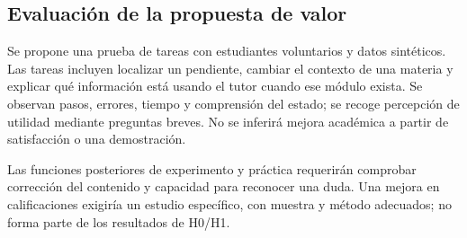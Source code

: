 \subsection{Evaluación de la propuesta de valor}
Se propone una prueba de tareas con estudiantes voluntarios y datos sintéticos. Las tareas incluyen localizar un pendiente, cambiar el contexto de una materia y explicar qué información está usando el tutor cuando ese módulo exista. Se observan pasos, errores, tiempo y comprensión del estado; se recoge percepción de utilidad mediante preguntas breves. No se inferirá mejora académica a partir de satisfacción o una demostración.

Las funciones posteriores de experimento y práctica requerirán comprobar corrección del contenido y capacidad para reconocer una duda. Una mejora en calificaciones exigiría un estudio específico, con muestra y método adecuados; no forma parte de los resultados de H0/H1.

